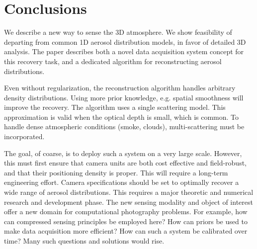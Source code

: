 \documentclass[10pt,letterpaper]{article}
\begin{document}

\section{Conclusions}
\label{sec:conclusions}

We describe a new way to sense the 3D atmosphere. We show feasibility
of departing from common 1D aerosol distribution models, in favor of
detailed 3D analysis.  The paper describes both a novel data
acquisition system concept for this recovery task, and a dedicated
algorithm for reconstructing aerosol distributions.

Even without regularization, the reconstruction algorithm handles
arbitrary density distributions. Using more prior knowledge,
e.g. spatial smoothness will improve the recovery.  The algorithm uses
a single scattering model. This approximation is valid when the
optical depth is small, which is common. To handle dense atmospheric
conditions (smoke, clouds), multi-scattering must be incorporated.

The goal, of coarse, is to deploy such a system on a very large
scale. However, this must first ensure that camera units are both cost
effective and field-robust, and that their positioning density is
proper. This will require a long-term engineering effort. Camera
specifications should be set to optimally recover a wide range of
aerosol distributions. This requires a major theoretic and numerical
research and development phase.  The new sensing modality and object
of interest offer a new domain for computational photography
problems. For example, how can compressed sensing principles be
employed here? How can priors be used to make data acquisition more
efficient? How can such a system be calibrated over time? Many such
questions and solutions would rise.
\end{document}
